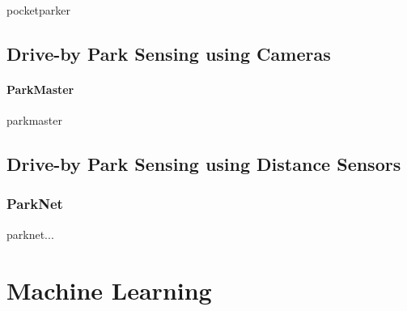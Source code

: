 pocketparker \cite{Nandugudi:2014:PPP:2632048.2632098}

\subsection{Drive-by Park Sensing using Cameras}
\label{sec:related_driveby_park_sensing_cameras}

\paragraph{ParkMaster}
 
parkmaster \cite{Grassi:2017:PIE:3132211.3134452}


\subsection{Drive-by Park Sensing using Distance Sensors}
\label{sec:related_driveby_park_sensing_distance}

\subsubsection{ParkNet}
\label{sec:parknet}

parknet... \cite{Mathur:2010:PDS:1814433.1814448}







\section{Machine Learning}

